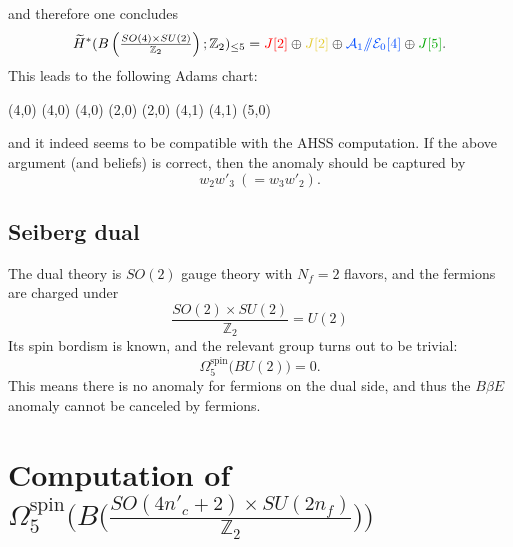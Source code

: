 \documentclass[12pt]{article}
\numberwithin{equation}{section}
\newcommand*{\colorA}[1]{\textcolor{colorA}{#1}}
\newcommand*{\colorB}[1]{\textcolor{colorB}{#1}}
\newcommand*{\colorC}[1]{\textcolor{colorC}{#1}}
\newcommand*{\colorD}[1]{\textcolor{colorD}{#1}}
\def\bZ{\mathbb{Z}}
\begin{document}
and therefore one concludes
\begin{equation}
	\widetilde H^\ast(B\left(\tfrac{SO(4)\times SU(2)}{\bZ_2}\right);\bZ_2)_{\leq 5} = \colorA{J[2]} \oplus \colorC{J[2]} \oplus \colorB{\mathcal{A}_1/\!\!/\mathcal{E}_0[4]} \oplus \colorD{J[5]}.
\end{equation}
This leads to the following Adams chart:
\begin{center}
	\begin{sseqdata}[
		name=M,
		Adams grading,
		classes = fill,
		xrange = {0}{5},
		yrange = {0}{3},
	]
		\tower[colorB](4,0)
		\class[white](4,0)
		\class[white](4,0)
		\class[colorA](2,0)
		\class[colorC](2,0)
		\tower[colorA](4,1)
		\tower[colorC](4,1)
		\class[colorD](5,0)
	\end{sseqdata}
	\printpage[name = M,page = 2]
\end{center}
and it indeed seems to be compatible with the AHSS computation.
If the above argument (and beliefs) is correct, then the anomaly should be captured by
\begin{equation}
	w_2w'_3\ (= w_3w'_2).
\end{equation}

\subsection{Seiberg dual}
The dual theory is $SO(2)$ gauge theory with $N_f = 2$ flavors, and the fermions are charged under
\begin{equation}
	\frac{SO(2)\times SU(2)}{\bZ_2}
	=
	U(2)
\end{equation}
Its spin bordism is known, and the relevant group turns out to be trivial:
\begin{equation}
	\Omega_5^{\mathrm{spin}}\big(BU(2)\big) = 0.
\end{equation}
This means there is no anomaly for fermions on the dual side,
and thus the $B\beta E$ anomaly cannot be canceled by fermions.

\newpage

\section{Computation of $\Omega_5^{\mathrm{spin}}\big(
	B\big(
		\tfrac{SO(4n'_c+2)\times SU(2n_f)}{\bZ_2}
	\big)
\big)$}
\end{document}
